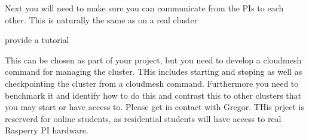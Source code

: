 Next you will need to make sure you can communicate from the PIs to
each other. This is naturally the same as on a real cluster

\begin{exercise}
provide a tutorial 
\end{exercise}

This can be chosen as part of your project, but you need to develop a
cloudmesh command for managing the cluster. THis includes starting and
stoping as well as checkpointing the cluster from a cloudmesh
command. Furthermore you need to benchmark it and identify how to do
this and contrast this to other clusters that you may start or have
access to. Please get in contact with Gregor. THis prject is reserverd
for online students, as residential students will have access to real
Rasperry PI hardware.

